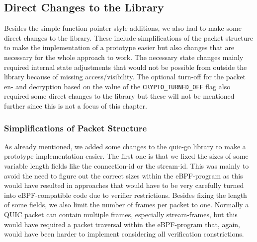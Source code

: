 \subsection{Direct Changes to the Library}

Besides the simple function-pointer style additions, we also had to make some direct changes to the library.
These include simplifications of the packet structure to make the implementation of a prototype easier 
but also changes that are necessary for the whole approach to work.
The necessary state changes mainly required internal state adjustments that would not be possible from outside 
the library because of missing access/visibility.
The optional turn-off for the packet en- and decryption based on the value of the \verb|CRYPTO_TURNED_OFF| flag
also required some direct changes to the library but these will not be mentioned further since this is not a 
focus of this chapter.

\subsubsection*{Simplifications of Packet Structure}
As already mentioned, we added some changes to the quic-go library to make a prototype implementation easier.
The first one is that we fixed the sizes of some variable length fields like the connection-id or the stream-id.
This was mainly to avoid the need to figure out the correct sizes within the eBPF-program as this would have 
resulted in approaches that would have to be very carefully turned into eBPF-compatible code due to verifier
restrictions.
Besides fixing the length of some fields, we also limit the number of frames per packet to one.
Normally a QUIC packet can contain multiple frames, especially stream-frames, but this would have required 
a packet traversal within the eBPF-program that, again, would have been harder to implement considering all
verification constrictions.

